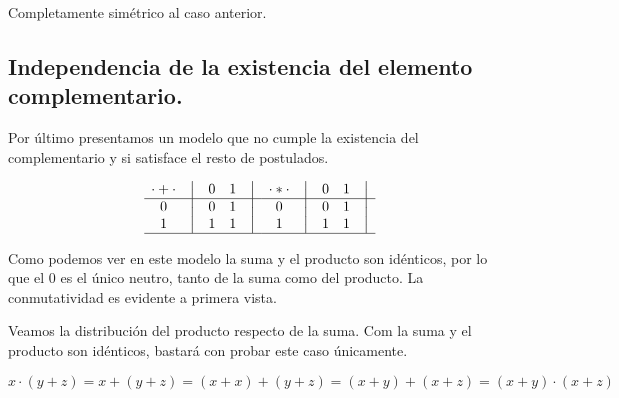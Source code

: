\documentclass[12pt,a4paper]{article}
\begin{document}
	Completamente simétrico al caso anterior.



\subsection{Independencia de la existencia del elemento complementario.}



	Por último presentamos un modelo que no cumple la existencia del
complementario y si satisface el resto de postulados.



\begin{equation}
    \begin{matrix}
        {\cdot + \cdot} & \big{\vert} & {0} & {1} & \big{\vert} \\
        \hline
        {0}             & \big{\vert} & {0} & {1} & \big{\vert} \\
        {1}             & \big{\vert} & {1} & {1} & \big{\vert} \\
        \hline
    \end{matrix}
    \quad
    \begin{matrix}
        {\cdot * \cdot} & \big{\vert} & {0} & {1} & \big{\vert} \\
        \hline
        {0}                   & \big{\vert} & {0} & {1} & \big{\vert} \\
        {1}                   & \big{\vert} & {1} & {1} & \big{\vert} \\
        \hline
    \end{matrix}
\end{equation}



	Como podemos ver en este modelo la suma y el producto son idénticos, por
lo que el \(0\) es el único neutro, tanto de la suma como del producto. La
conmutatividad es evidente a primera vista. 


	Veamos la distribución del producto respecto de la suma. Com la suma y el
producto son idénticos, bastará con probar este caso únicamente.



\begin{equation}
x \cdot (y + z) = x + ( y + z ) = ( x + x ) + ( y + z ) = ( x + y ) + ( x + z
) = ( x + y ) \cdot ( x + z )
\end{equation}
\end{document}

